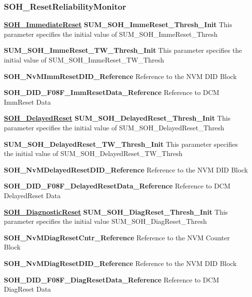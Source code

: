 \subsubsection{\textbf{SOH\_ResetReliabilityMonitor}}

\textbf{\underline{SOH\_ImmediateReset}}\newline
\textbf{SUM\_SOH\_ImmeReset\_Thresh\_Init}\newline
This parameter specifies the initial value of SUM\_SOH\_ImmeReset\_Thresh

\textbf{SUM\_SOH\_ImmeReset\_TW\_Thresh\_Init}\newline
This parameter specifies the initial value of SUM\_SOH\_ImmeReset\_TW\_Thresh

\textbf{SOH\_NvMImmResetDID\_Reference}\newline
Reference to the NVM DID Block

\textbf{SOH\_DID\_F08F\_ImmResetData\_Reference}\newline
Reference to DCM ImmReset Data

\textbf{\underline{SOH\_DelayedReset}}\newline
\textbf{SUM\_SOH\_DelayedReset\_Thresh\_Init}\newline
This parameter specifies the initial value of SUM\_SOH\_DelayedReset\_Thresh

\textbf{SUM\_SOH\_DelayedReset\_TW\_Thresh\_Init}\newline
This parameter specifies the initial value of SUM\_SOH\_DelayedReset\_TW\_Thresh

\textbf{SOH\_NvMDelayedResetDID\_Reference}\newline
Reference to the NVM DID Block

\textbf{SOH\_DID\_F08F\_DelayedResetData\_Reference}\newline
Reference to DCM DelayedReset Data

\textbf{\underline{SOH\_DiagnosticReset}}\newline
\textbf{SUM\_SOH\_DiagReset\_Thresh\_Init}\newline
This parameter specifies the initial value SUM\_SOH\_DiagReset\_Thresh

\textbf{SOH\_NvMDiagResetCntr\_Reference}\newline
Reference to the NVM Counter Block

\textbf{SOH\_NvMDiagResetDID\_Reference }\newline
Reference to the NVM DID Block

\textbf{SOH\_DID\_F08F\_DiagResetData\_Reference}\newline
Reference to DCM DiagReset Data


